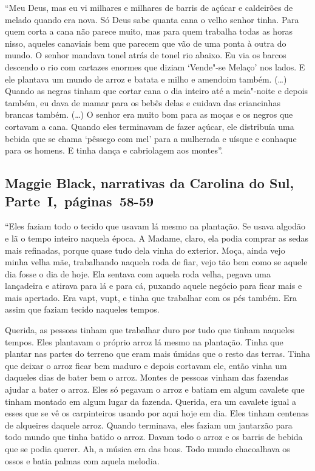 ``Meu Deus, mas eu vi milhares e milhares de barris de açúcar e
caldeirões de melado quando era nova. Só Deus sabe quanta cana o velho
senhor tinha. Para quem corta a cana não parece muito, mas para quem
trabalha todas as horas nisso, aqueles canaviais bem que parecem que vão
de uma ponta à outra do mundo. O senhor mandava tonel atrás de tonel rio
abaixo. Eu via os barcos descendo o rio com cartazes enormes que diziam
`Vende"-se Melaço' nos lados. E ele plantava um mundo de arroz e batata e
milho e amendoim também. (\ldots{}) Quando as negras tinham que cortar
cana o dia inteiro até a meia"-noite e depois também, eu dava de mamar
para os bebês delas e cuidava das criancinhas brancas também. (\ldots{})
O senhor era muito bom para as moças e os negros que cortavam a cana.
Quando eles terminavam de fazer açúcar, ele distribuía uma bebida que se
chama `pêssego com mel' para a mulherada e uísque e conhaque para os
homens. E tinha dança e cabriolagem aos montes''.

\subsection{Maggie Black, narrativas da Carolina do Sul, Parte~I,~páginas~58-59} \label{ref26}

``Eles faziam todo o tecido que usavam lá mesmo na plantação. Se usava
algodão e lã o tempo inteiro naquela época. A Madame, claro, ela podia
comprar as sedas mais refinadas, porque quase tudo dela vinha do
exterior. Moça, ainda vejo minha velha mãe, trabalhando naquela roda de
fiar, vejo tão bem como se aquele dia fosse o dia de hoje. Ela sentava
com aquela roda velha, pegava uma lançadeira e atirava para lá e para
cá, puxando aquele negócio para ficar mais e mais apertado. Era vapt,
vupt, e tinha que trabalhar com os pés também. Era assim que faziam
tecido naqueles tempos.

Querida, as pessoas tinham que trabalhar duro por tudo que tinham
naqueles tempos. Eles plantavam o próprio arroz lá mesmo na plantação.
Tinha que plantar nas partes do terreno que eram mais úmidas que o resto
das terras. Tinha que deixar o arroz ficar bem maduro e depois cortavam
ele, então vinha um daqueles dias de bater bem o arroz. Montes de
pessoas vinham das fazendas ajudar a bater o arroz. Eles só pegavam o
arroz e batiam em algum cavalete que tinham montado em algum lugar da
fazenda. Querida, era um cavalete igual a esses que se vê os
carpinteiros usando por aqui hoje em dia. Eles tinham centenas de
alqueires daquele arroz. Quando terminava, eles faziam um jantarzão para
todo mundo que tinha batido o arroz. Davam todo o arroz e os barris de
bebida que se podia querer. Ah, a música era das boas. Todo mundo
chacoalhava os ossos e batia palmas com aquela melodia.

